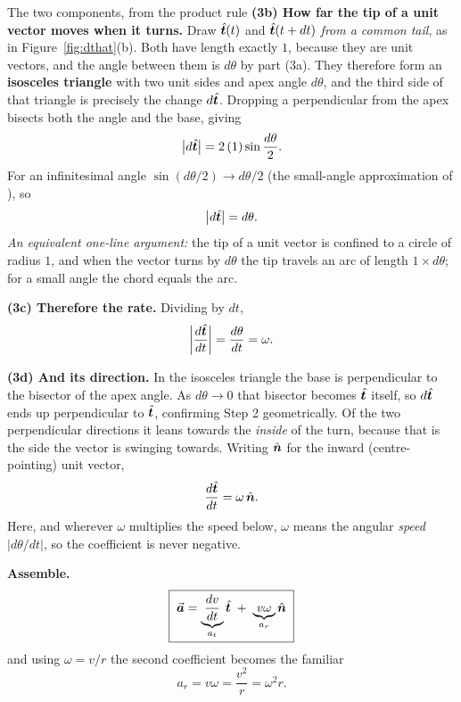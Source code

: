 \begin{derivbox}{The two components, from the product rule}
\smallskip
\textbf{(3b) How far the tip of a unit vector moves when it turns.} Draw $\hat{\bm{t}}(t)$ and
$\hat{\bm{t}}(t+dt)$ \emph{from a common tail}, as in Figure~\ref{fig:dthat}(b). Both have length exactly $1$, because they are unit
vectors, and the angle between them is $d\theta$ by part (3a). They therefore form an
\textbf{isosceles triangle} with two unit sides and apex angle $d\theta$, and the third side of that
triangle is precisely the change $d\hat{\bm{t}}$. Dropping a perpendicular from the apex bisects both the
angle and the base, giving
\[
\left|d\hat{\bm{t}}\right| = 2\,(1)\sin\frac{d\theta}{2}.
\]
For an infinitesimal angle $\sin(d\theta/2)\to d\theta/2$ (the small-angle approximation of
), so
\[
\left|d\hat{\bm{t}}\right| = d\theta.
\]
\emph{An equivalent one-line argument:} the tip of a unit vector is confined to a circle of radius $1$,
and when the vector turns by $d\theta$ the tip travels an arc of length $1\times d\theta$; for a small
angle the chord equals the arc.

\smallskip
\textbf{(3c) Therefore the rate.} Dividing by $dt$,
\[
\left|\frac{d\hat{\bm{t}}}{dt}\right|=\frac{d\theta}{dt}=\omega.
\]

\smallskip
\textbf{(3d) And its direction.} In the isosceles triangle the base is perpendicular to the bisector of
the apex angle. As $d\theta\to0$ that bisector becomes $\hat{\bm{t}}$ itself, so $d\hat{\bm{t}}$ ends up
perpendicular to $\hat{\bm{t}}$, confirming Step 2 geometrically. Of the two perpendicular directions it
leans towards the \emph{inside} of the turn, because that is the side the vector is swinging towards.
Writing $\hat{\bm{n}}$ for the inward (centre-pointing) unit vector,
\[
\frac{d\hat{\bm{t}}}{dt}=\omega\,\hat{\bm{n}}.
\]
Here, and wherever $\omega$ multiplies the speed below, $\omega$ means the angular \emph{speed}
$|d\theta/dt|$, so the coefficient is never negative.

\begin{figbox}
\centering
{}
\end{figbox}

 \textbf{Assemble.}
\[
\boxed{\;\vec{\bm{a}}=\underbrace{\frac{dv}{dt}}_{a_t}\hat{\bm{t}}\;+\;\underbrace{v\omega}_{a_r}\hat{\bm{n}}\;}
\]
and using $\omega=v/r$ the second coefficient becomes the familiar
\[
a_r=v\omega=\frac{v^{2}}{r}=\omega^{2}r.
\]
\end{derivbox}


